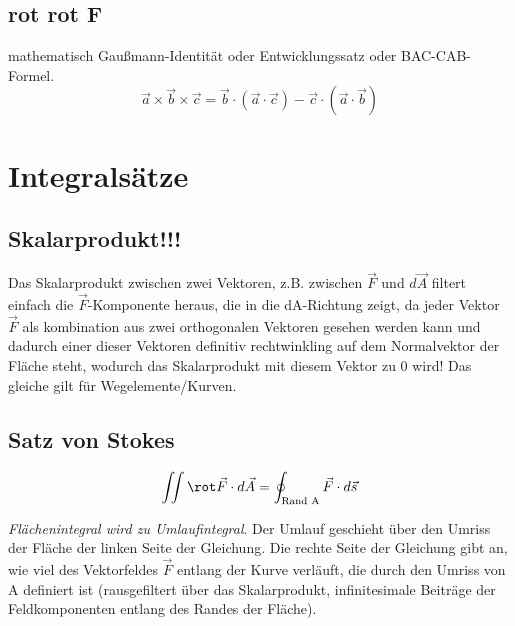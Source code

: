 \documentclass[11pt, a4paper]{article}
\begin{document}

\subsection{rot rot F}
mathematisch \glqq Gaußmann-Identität\grqq{} oder \glqq Entwicklungssatz\grqq{} oder \glqq BAC-CAB-Formel\grqq{}.
\[\vec{a} \times \vec{b} \times \vec{c} = \vec{b} \cdot (\vec{a} \cdot \vec{c}) - \vec{c} \cdot (\vec{a} \cdot \vec{b})\]

\section{Integralsätze}
\subsection{Skalarprodukt!!!}
Das Skalarprodukt zwischen zwei Vektoren, z.B. zwischen $\vec{F}$ und $d\vec{A}$ filtert einfach die $\vec{F}$-Komponente heraus, die in die dA-Richtung zeigt, da jeder Vektor $\vec{F}$ als kombination aus zwei orthogonalen Vektoren gesehen werden kann und dadurch einer dieser Vektoren definitiv rechtwinkling auf dem Normalvektor der Fläche steht, wodurch das Skalarprodukt mit diesem Vektor zu 0 wird! Das gleiche gilt für Wegelemente/Kurven.

\begin{figure}[H]
\centering
{}
\end{figure}

\begin{figure}[H]
\centering
{}
\end{figure}

\subsection{Satz von Stokes}
\[\iint{\rot \vec{F} \cdot d\vec{A}} = \oint_{\text{Rand A}}{\vec{F} \cdot d\vec{s}}\]

\emph{Flächenintegral wird zu Umlaufintegral}. Der Umlauf geschieht über den Umriss der Fläche der linken Seite der Gleichung.
Die rechte Seite der Gleichung gibt an, wie viel des Vektorfeldes $\vec{F}$ entlang der Kurve verläuft, die durch den Umriss von A definiert ist (rausgefiltert über das Skalarprodukt, infinitesimale Beiträge der Feldkomponenten entlang des Randes der Fläche).
\end{document}
